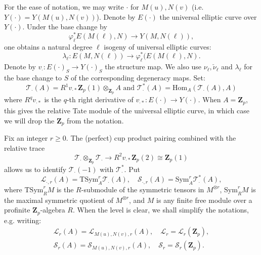 \documentclass[10pt,letterpaper]{amsart}
\theoremstyle{plain}
\theoremstyle{definition}
\theoremstyle{definition}
\theoremstyle{plain}
\theoremstyle{plain}
\theoremstyle{plain}
\theoremstyle{remark}
\numberwithin{equation}{section}
\DeclareMathOperator{\et}{\acute{e}t}
\newcommand{\Z}{\mathbf{Z}}
\begin{document}
For the ease of notation, we may write $\cdot$ for $M(u),N(v)$ (i.e. $Y(\cdot)=Y(M(u),N(v))$). Denote by $E(\cdot)$ the universal elliptic curve over $Y(\cdot)$. Under the base change by \[\varphi_\ell^{*}E(M(\ell),N)\rightarrow Y(M,N(\ell)),\] one obtains a natural degree $\ell$ isogeny of universal elliptic curves:
\begin{equation*}
    \lambda_\ell: E(M,N(\ell))\rightarrow \varphi_\ell^{*}(E(M(\ell),N).
\end{equation*}
Denote by $v_{\cdot}: E(\cdot)_S\rightarrow Y(\cdot)_S$ the structure map. We also use $\nu_\ell,\check{\nu}_\ell$ and $\lambda_\ell$ for the base change to $S$ of the corresponding degeneracy maps. Set:
\begin{equation*}
    \mathscr{T}_{\cdot}(A)=R^1v_{\cdot*}\Z_p(1)\otimes_{\Z_p}A \text{  and  } \mathscr{T}_{\cdot}^{*}(A)=\text{Hom}_{A}(\mathscr{T}_{\cdot}(A),A)
\end{equation*}
where $R^qv_{\cdot*}$ is the $q$-th right derivative of $v_{\cdot*}:E(\cdot)_{\et}\rightarrow Y(\cdot)_{\et}$. When $A=\Z_p$, this gives the relative Tate module of the universal elliptic curve, in which case we will drop the $\Z_p$ from the notation. 

Fix an integer $r\ge 0$. The (perfect) cup product pairing combined with the relative trace
\begin{equation*}
\mathscr{T}_{\cdot}\otimes_{\Z_p}\mathscr{T}_{\cdot}\rightarrow R^2v_{\cdot*}\Z_p(2)\cong \Z_p(1)
\end{equation*}
allows us to identify $\mathscr{T}_{\cdot}(-1)$ with $\mathscr{T}_{\cdot}^{*}$. 
Put
\begin{equation*}
    \mathscr{L}_{\cdot,r}(A)=\text{TSym}^{r}_A\mathscr{T}_{\cdot}(A),\quad\mathscr{S}_{\cdot,r}(A)=\text{Sym}^{r}_A\mathscr{T}_{\cdot}^{*}(A),
\end{equation*}
where $\text{TSym}^{r}_R M$ is the $R$-submodule of the symmetric tensors in $M^{\otimes r}$, $\text{Sym}^{r}_R M$ is the maximal symmetric quotient of $M^{\otimes r}$, and $M$ is any finite free module over a profinite $\Z_p$-algebra $R$. When the level is clear, we shall simplify the notations, e.g. writing:
\begin{equation}\label{LlSs}
\begin{aligned}
    \mathscr{L}_r(A)=\mathscr{L}_{M(u),N(v),r}(A),\quad\mathscr{L}_r=\mathscr{L}_r(\Z_p),\\
    \mathscr{S}_r(A)=\mathscr{S}_{M(u),N(v),r}(A),\quad \mathscr{S}_r=\mathscr{S}_r(\Z_p).
\end{aligned}
\end{equation}
\end{document}

